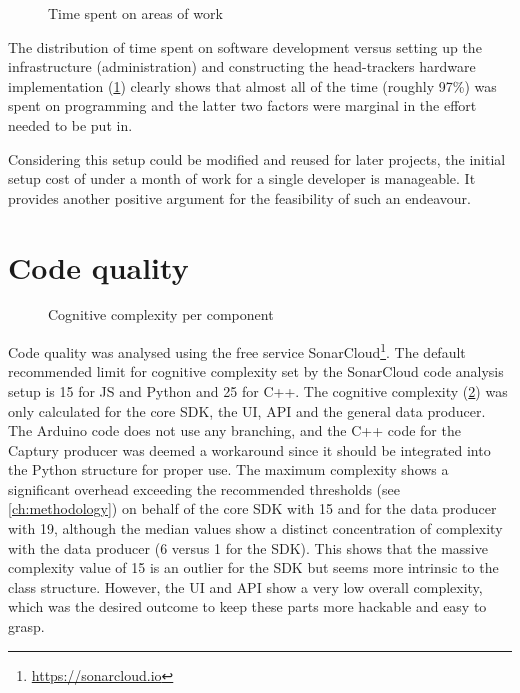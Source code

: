 \begin{figure}[h]
\centering

\caption[Time spent on areas of work]{Time spent on areas of work\protect}
\label{fig:timeSpentTypeOfWork}
\end{figure}

The distribution of time spent on software development versus setting up the infrastructure (administration) and constructing the head-tracker\textquotesingle s hardware implementation (\ref{fig:timeSpentTypeOfWork}) clearly shows that almost all of the time (roughly 97\%) was spent on programming and the latter two factors were marginal in the effort needed to be put in.

Considering this setup could be modified and reused for later projects, the initial setup cost of under a month of work for a single developer is manageable.
It provides another positive argument for the feasibility of such an endeavour.

\section{Code quality}
\label{sec:code-quality}

\begin{figure}[h]
\centering

\caption[Cognitive complexity]{Cognitive complexity per component\protect}
\label{fig:cognitiveComplexity}
\end{figure}

Code quality was analysed using the free service SonarCloud\footnote{\url{https://sonarcloud.io}}.
The default recommended limit for cognitive complexity set by the SonarCloud code analysis setup is 15 for \ac{JS} and Python and 25 for C++.
The cognitive complexity (\ref{fig:cognitiveComplexity}) was only calculated for the core \ac{SDK}, the \ac{UI}, \ac{API} and the general data producer.
The Arduino code does not use any branching, and the C++ code for the Captury producer was deemed a workaround since it should be integrated into the Python structure for proper use.
The maximum complexity shows a significant overhead exceeding the recommended thresholds (see \autoref{ch:methodology}) on behalf of the core \ac{SDK} with 15 and for the data producer with 19, although the median values show a distinct concentration of complexity with the data producer (6 versus 1 for the \ac{SDK}).
This shows that the massive complexity value of 15 is an outlier for the \ac{SDK} but seems more intrinsic to the  class structure.
However, the \ac{UI} and \ac{API} show a very low overall complexity, which was the desired outcome to keep these parts more hackable and easy to grasp.

